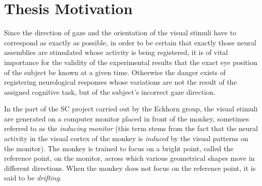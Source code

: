 
\section{Thesis Motivation}
\label{intro:motivation}

Since the direction of gaze and the orientation of the visual stimuli
have to correspond as exactly as possible, in order to be certain that
exactly those neural assemblies are stimulated whose activity is being
registered, it is of vital importance for the validity of the
experimental results that the exact eye position of the subject be
known at a given time.  Otherwise the danger exists of registering
neurological responses whose variations are not the result of the
assigned cognitive task, but of the subject's incorrect gaze
direction.  

In the part of the SC project carried out by the Eckhorn group, the
visual stimuli are generated on a computer monitor placed in front of
the monkey, sometimes referred to as the {\em inducing monitor\/}
(this term stems from the fact that the neural activity in the visual
cortex of the monkey is {\em induced\/} by the visual patterns on the
monitor).  The monkey is trained to focus on a bright point, called
the reference point, on the monitor, across which various geometrical
shapes move in different directions.  When the monkey does not focus
on the reference point, it is said to be {\em drifting\/}.

